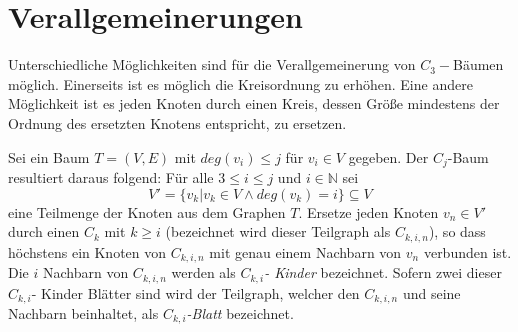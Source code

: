 \section{Verallgemeinerungen}
Unterschiedliche Möglichkeiten sind für die Verallgemeinerung von $C_3-$Bäumen möglich. Einerseits ist es möglich die Kreisordnung zu erhöhen. Eine andere Möglichkeit ist es jeden Knoten durch einen Kreis, dessen Größe mindestens der Ordnung des ersetzten Knotens entspricht, zu ersetzen.

\begin{defi}
Sei ein Baum $T=(V,E)$ mit $deg(v_i)\leq j$ für $v_i \in V$ gegeben. Der $C_j$-Baum resultiert daraus folgend: 
Für alle $3 \leq i \leq j$ und $i \in \mathbb{N}$ sei $$V'=\{v_k|v_k \in V \wedge deg(v_k)=i\}\subseteq V$$ eine Teilmenge der Knoten aus dem Graphen $T$. Ersetze jeden Knoten $v_n \in V'$ durch einen $C_k$ mit $k \geq i$ (bezeichnet wird dieser Teilgraph als \emph{$C_{k,i,n}$}), so dass höchstens ein Knoten von $C_{k,i,n}$ mit genau einem Nachbarn von $v_n$ verbunden ist. Die $i$ Nachbarn von $C_{k,i,n}$ werden als \emph{$C_{k,i}$- Kinder} bezeichnet. Sofern zwei dieser $C_{k,i}$- Kinder Blätter sind wird der Teilgraph, welcher den $C_{k,i,n}$ und seine Nachbarn beinhaltet, als \emph{$C_{k,i}$-Blatt} bezeichnet.
\end{defi}

